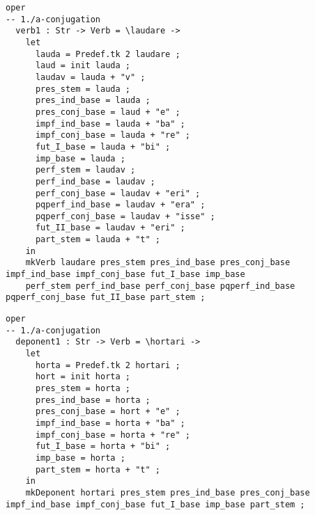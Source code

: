 \begin{lstlisting}[float=h!tp,caption={Bildung der Wortstämme und -stöcke für Verben der ersten Konjugation (vgl. \textbf{MorphoLat.gf})},label={GF-Morpho-Verb3c},basicstyle=\small]
oper
-- 1./a-conjugation
  verb1 : Str -> Verb = \laudare ->
    let
      lauda = Predef.tk 2 laudare ;
      laud = init lauda ;
      laudav = lauda + "v" ;
      pres_stem = lauda ;
      pres_ind_base = lauda ;
      pres_conj_base = laud + "e" ;
      impf_ind_base = lauda + "ba" ;
      impf_conj_base = lauda + "re" ;
      fut_I_base = lauda + "bi" ;
      imp_base = lauda ;
      perf_stem = laudav ;
      perf_ind_base = laudav ;
      perf_conj_base = laudav + "eri" ;
      pqperf_ind_base = laudav + "era" ;
      pqperf_conj_base = laudav + "isse" ;
      fut_II_base = laudav + "eri" ;
      part_stem = lauda + "t" ;
    in
    mkVerb laudare pres_stem pres_ind_base pres_conj_base impf_ind_base impf_conj_base fut_I_base imp_base
    perf_stem perf_ind_base perf_conj_base pqperf_ind_base pqperf_conj_base fut_II_base part_stem ;
\end{lstlisting}
\begin{lstlisting}[float=h!tp,caption={Bildung der Wortstämme und -stöcke für Deponentia der ersten Konjugation (vgl. \textbf{MorphoLat.gf})},label={GF-Morpho-Verb3c},basicstyle=\small]
oper
-- 1./a-conjugation
  deponent1 : Str -> Verb = \hortari ->
    let
      horta = Predef.tk 2 hortari ;
      hort = init horta ;
      pres_stem = horta ;
      pres_ind_base = horta ;
      pres_conj_base = hort + "e" ;
      impf_ind_base = horta + "ba" ;
      impf_conj_base = horta + "re" ;
      fut_I_base = horta + "bi" ;
      imp_base = horta ;
      part_stem = horta + "t" ;
    in
    mkDeponent hortari pres_stem pres_ind_base pres_conj_base impf_ind_base impf_conj_base fut_I_base imp_base part_stem ;
\end{lstlisting}
